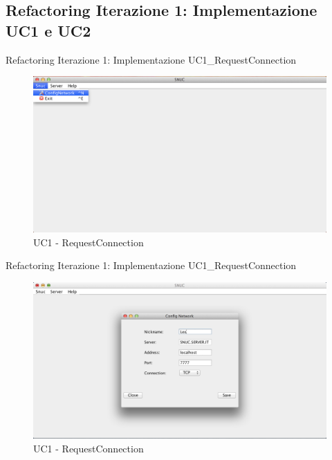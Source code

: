 \subsection{Refactoring Iterazione 1: Implementazione UC1 e UC2}
 \begin{frame} {Refactoring Iterazione 1: Implementazione  UC1\_RequestConnection }
   \begin{figure}
    \includegraphics[scale=0.32]{image_implementation/uc1/1.png}{\centering}
    \caption{UC1 - RequestConnection}
   \end{figure}
 \end{frame}

 \begin{frame} {Refactoring Iterazione 1: Implementazione  UC1\_RequestConnection }
   \begin{figure}
    \includegraphics[scale=0.32]{image_implementation/uc1/2.png}{\centering}
    \caption{UC1 - RequestConnection}
   \end{figure}
 \end{frame}

